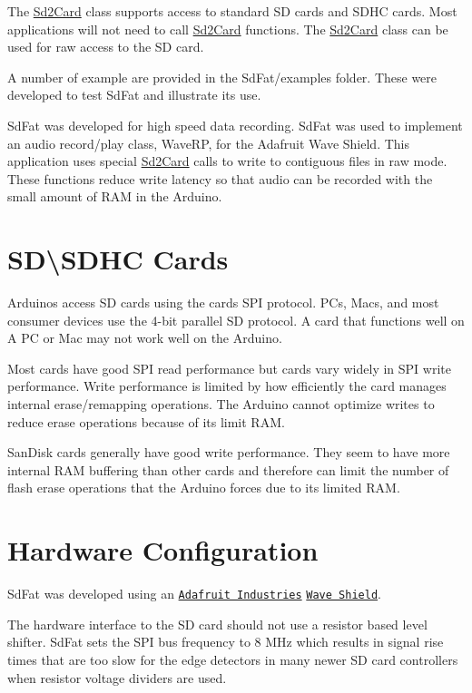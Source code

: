 The \hyperlink{class_sd2_card}{Sd2\-Card} class supports access to standard S\-D cards and S\-D\-H\-C cards. Most applications will not need to call \hyperlink{class_sd2_card}{Sd2\-Card} functions. The \hyperlink{class_sd2_card}{Sd2\-Card} class can be used for raw access to the S\-D card.

A number of example are provided in the Sd\-Fat/examples folder. These were developed to test Sd\-Fat and illustrate its use.

Sd\-Fat was developed for high speed data recording. Sd\-Fat was used to implement an audio record/play class, Wave\-R\-P, for the Adafruit Wave Shield. This application uses special \hyperlink{class_sd2_card}{Sd2\-Card} calls to write to contiguous files in raw mode. These functions reduce write latency so that audio can be recorded with the small amount of R\-A\-M in the Arduino.\hypertarget{index_SDcard}{}\section{S\-D\textbackslash{}\-S\-D\-H\-C Cards}\label{index_SDcard}
Arduinos access S\-D cards using the cards S\-P\-I protocol. P\-Cs, Macs, and most consumer devices use the 4-\/bit parallel S\-D protocol. A card that functions well on A P\-C or Mac may not work well on the Arduino.

Most cards have good S\-P\-I read performance but cards vary widely in S\-P\-I write performance. Write performance is limited by how efficiently the card manages internal erase/remapping operations. The Arduino cannot optimize writes to reduce erase operations because of its limit R\-A\-M.

San\-Disk cards generally have good write performance. They seem to have more internal R\-A\-M buffering than other cards and therefore can limit the number of flash erase operations that the Arduino forces due to its limited R\-A\-M.\hypertarget{index_Hardware}{}\section{Hardware Configuration}\label{index_Hardware}
Sd\-Fat was developed using an \href{http://www.adafruit.com/}{\tt Adafruit Industries} \href{http://www.ladyada.net/make/waveshield/}{\tt Wave Shield}.

The hardware interface to the S\-D card should not use a resistor based level shifter. Sd\-Fat sets the S\-P\-I bus frequency to 8 M\-Hz which results in signal rise times that are too slow for the edge detectors in many newer S\-D card controllers when resistor voltage dividers are used.

